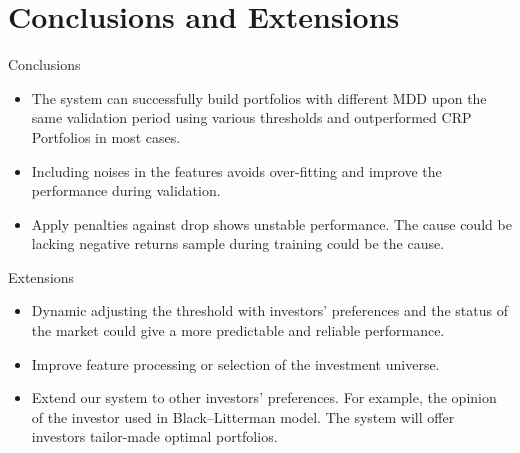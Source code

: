 \section{Conclusions and Extensions}
\begin{frame}{Conclusions}
\begin{itemize}
    \item The system can successfully build portfolios with different MDD upon the same validation period using various thresholds and outperformed CRP Portfolios in most cases.
    \item Including noises in the features avoids over-fitting and improve the performance during validation.
    \item Apply penalties against drop shows unstable performance. The cause could be lacking negative returns sample during training could be the cause.
\end{itemize}
\end{frame}



\begin{frame}{Extensions}
\begin{itemize}
    \item  Dynamic adjusting the threshold with investors' preferences and the status of the market could give a more predictable and reliable performance.
    \item Improve feature processing or selection of the investment universe.
    \item Extend our system to other investors' preferences. For example, the opinion of the investor used in Black–Litterman model. The system will offer investors tailor-made optimal portfolios.
\end{itemize}
\par
\end{frame}